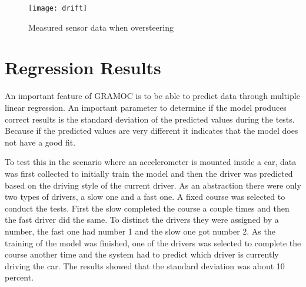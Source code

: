 \begin{figure}[H]
    \centering
    \texttt{[image: drift]}
    \caption{Measured sensor data when oversteering}
    \label{fig:Oversteer}
\end{figure}

\section{Regression Results}
An important feature of GRAMOC is to be able to predict data through multiple linear regression. An important parameter to determine if the model produces correct results is the standard deviation of the predicted values during the tests. Because if the predicted values are very different it indicates that the model does not have a good fit.


To test this in the scenario where an accelerometer is mounted inside a car, data was first collected to initially train the model and then the driver was predicted based on the driving style of the current driver. As an abstraction there were only two types of drivers, a slow one and a fast one. A fixed course was selected to conduct the tests. First the slow completed the course a couple times and then the fast driver did the same. To distinct the drivers they were assigned by a number, the fast one had number 1 and the slow one got number 2. As the training of the model was finished, one of the drivers was selected to complete the course another time and the system had to predict which driver is currently driving the car. The results showed that the standard deviation was about 10 percent.

